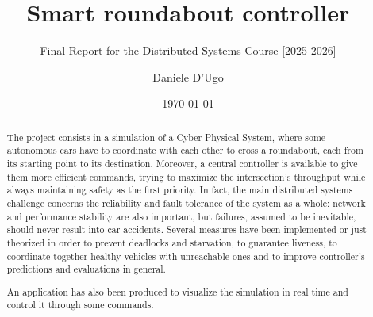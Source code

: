 \documentclass{scrartcl}
\title{\LARGE
    Smart roundabout controller
}
\subtitle{Final Report for the Distributed Systems Course [2025-2026]}
\author{
    Daniele D'Ugo \\ \emailaddr{daniele.dugo@studio.unibo.it}
}
\date{\today}
\begin{document}
\maketitle

\begin{abstract}
    The project consists in a simulation of a Cyber-Physical System, where some
    autonomous cars have to coordinate with each other to cross a roundabout,
    each from its starting point to its destination. Moreover, a central
    controller is available to give them more efficient commands, trying to
    maximize the intersection's throughput while always maintaining safety as
    the first priority. In fact, the main distributed systems challenge concerns
    the reliability and fault tolerance of the system as a whole: network and
    performance stability are also important, but failures, assumed to be
    inevitable, should never result into car accidents. Several measures have
    been implemented or just theorized in order to prevent deadlocks and
    starvation, to guarantee liveness, to coordinate together healthy vehicles
    with unreachable ones and to improve controller's predictions and
    evaluations in general.

    An application has also been produced to visualize the simulation in real
    time and control it through some commands.
\end{abstract}


%




















%
%
\end{document}
